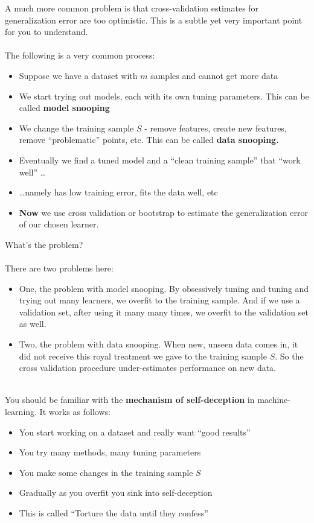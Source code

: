 A much more common problem is that cross-validation estimates for generalization
error are too optimistic. This is a subtle yet very important point for you to
understand.  
\\~\\
The following is a very common process:
\begin{itemize}
      \item Suppose we have a dataset with $m$ samples and cannot get more data
      \item We start trying out models, each with its own tuning parameters.
        This can be called {\bf model snooping}
      \item We change the training sample $S$ - remove features, create new
        features, 
        remove ``problematic'' points, etc. This can be called {\bf data
        snooping.} 
      \item Eventually we find a tuned model and a ``clean training sample'' that ``work well'' \ldots
      \item \ldots namely has low training error, fits the data well, etc
      \item {\bf Now} we use cross validation or bootstrap to estimate the
        generalization error of our chosen learner.
    \end{itemize}

    What's the problem? 
\\~\\
    There are two problems here:
    \begin{itemize}
      \item 
    One, the problem with model snooping. By obsessively tuning and tuning and trying out many learners, we overfit to
    the training sample. And if we use a validation set, after using it many
    many times, we overfit to the validation set as well.
  \item
    Two, the problem with data snooping. When new, unseen data comes in, it did not receive this
    royal treatment we gave to the training sample $S$. So the cross validation
    procedure under-estimates performance on new data.

\end{itemize}

~\\   
You should be familiar with the {\bf mechanism of self-deception} 
in machine-learning. It works as follows:
    \begin{itemize}
      \item You start working on a dataset and really want ``good results''
      \item You try many methods, many tuning parameters
      \item You make some changes in the training sample $S$ 
      \item Gradually as you overfit you sink into self-deception
      \item This is called ``Torture the data until they confess''
    \end{itemize}


